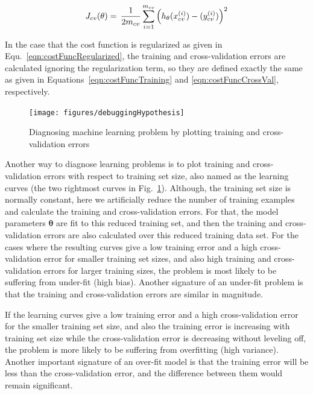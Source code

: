 \begin{equation}{\label{eqn:crossvalError}}
J_{cv}(\theta)
=\,
\frac{1}{2m_{cv}} \sum\limits_{i=1}^{m_{cv}} \Big(h_\theta(x_{cv}^{(i)}) - (y_{cv}^{(i)})\Big)^2  
\end{equation} 
\fi

In the case that the cost function is regularized as given in Equ.~\ref{eqn:costFuncRegularized}, the training and cross-validation errors are calculated ignoring the regularization term, so they are defined exactly the same as given in Equations~\ref{eqn:costFuncTraining} and \ref{eqn:costFuncCrossVal}, respectively.

\begin{landscape}
\begin{figure}
\begin{center}
\texttt{[image: figures/debuggingHypothesis]}    %
\caption{Diagnosing machine learning problem by plotting training and cross-validation errors} 
\label{fig:debuggingHypothesis}
\end{center}
\end{figure}
\end{landscape}

Another way to diagnose learning problems is to plot training and cross-validation errors with respect to training set size, also named as the learning curves (the two rightmost curves in Fig.~\ref{fig:debuggingHypothesis}). 
Although, the training set size is normally constant, here we artificially reduce the number of training examples and calculate the training and cross-validation errors. 
For that, the model parameters $\bm{\theta}$ are fit to this reduced training set, and then the training and cross-validation errors are also calculated over this reduced training data set. 
For the cases where the resulting curves give a low training error and a high cross-validation error for smaller training set sizes, and also high training and cross-validation errors for larger training sizes, the problem is most likely to be suffering from under-fit (high bias). 
Another signature of an under-fit problem is that the training and cross-validation errors are similar in magnitude. 

If the learning curves give a low training error and a high cross-validation error for the smaller training set size, and also the training error is increasing with training set size while the cross-validation error is  decreasing without leveling off, the problem is more likely to be suffering from overfitting (high variance). 
Another important signature of an over-fit model is that the training error will be less than the cross-validation error, and the difference between them would remain significant. 


